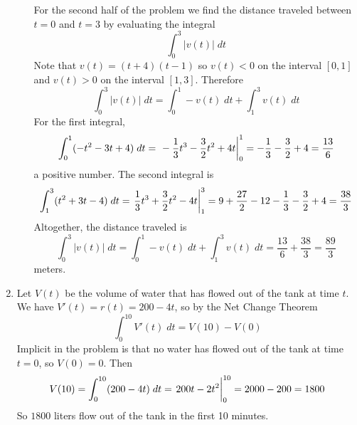 \documentclass{article}
\begin{document}
\begin{enumerate}
\begin{enumerate}
    For the second half of the problem we find the distance traveled
    between $t=0$ and $t=3$ by evaluating the integral
    \begin{equation*}
      \int_0^3 |v(t)| \; dt
    \end{equation*}
    Note that $v(t) = (t+4)(t-1)$ so $v(t)<0$ on the interval $[0,1]$
    and $v(t)>0$ on the interval $[1,3]$.  Therefore
    \begin{equation*}
      \int_0^3 |v(t)| \; dt
      = \int_0^1 -v(t) \; dt + \int_1^3 v(t) \; dt
    \end{equation*}
    For the first integral,
    \begin{equation*}
      \int_0^1 (-t^2 - 3t + 4) \; dt
      = \left. \vphantom{\int} -\frac{1}{3} t^3 - \frac{3}{2} t^2 + 4t
      \right|_0^1
      = -\frac{1}{3} - \frac{3}{2} + 4 = \frac{13}{6}
    \end{equation*}
    a positive number.  The second integral is
    \begin{equation*}
      \int_1^3 (t^2 + 3t-4) \; dt
      = \left. \vphantom{\int} \frac{1}{3} t^3 + \frac{3}{2} t^2 - 4t
      \right|_1^3
      = 9 + \frac{27}{2} - 12 - \frac{1}{3} - \frac{3}{2} + 4
      = \frac{38}{3}
    \end{equation*}
    Altogether, the distance traveled is
    \begin{equation*}
      \int_0^3 |v(t)| \; dt
      = \int_0^1 -v(t) \; dt + \int_1^3 v(t) \; dt
      = \frac{13}{6} + \frac{38}{3} = \frac{89}{3}
    \end{equation*}
    meters.
  \end{enumerate}
\item Let $V(t)$ be the volume of water that has flowed out of the
  tank at time $t$.  We have $V'(t)= r(t) = 200- 4t$, so by the Net
  Change Theorem
  \begin{equation*}
    \int_0^{10} V'(t) \; dt = V(10) - V(0)
  \end{equation*}
  Implicit in the problem is that no water has flowed out of the tank
  at time $t=0$, so $V(0)=0$.  Then
  \begin{equation*}
    V(10) = \int_0^{10} (200-4t) \; dt
    = \left. \vphantom{\int} 200t - 2t^2 \right|_0^{10}
    = 2000 - 200 = 1800
  \end{equation*}
  So $1800$ liters flow out of the tank in the first 10 minutes.
\end{enumerate}
\end{document}

